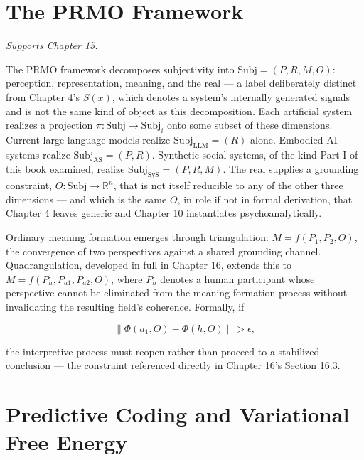 \documentclass[12pt,a4paper]{book}
\begin{document}

\chapter{The PRMO Framework}
\label{app:prmo}

\emph{Supports Chapter 15.}

The PRMO framework decomposes subjectivity into $\mathrm{Subj} = (P, R, M, O)$: perception, representation, meaning, and the real — a label deliberately distinct from Chapter 4's $S(x)$, which denotes a system's internally generated signals and is not the same kind of object as this decomposition. Each artificial system realizes a projection $\pi: \mathrm{Subj} \to \mathrm{Subj}_i$ onto some subset of these dimensions. Current large language models realize $\mathrm{Subj}_{\mathrm{LLM}} = (R)$ alone. Embodied AI systems realize $\mathrm{Subj}_{\mathrm{AS}} = (P, R)$. Synthetic social systems, of the kind Part I of this book examined, realize $\mathrm{Subj}_{\mathrm{SyS}} = (P, R, M)$. The real supplies a grounding constraint, $O: \mathrm{Subj} \to \mathbb{R}^n$, that is not itself reducible to any of the other three dimensions — and which is the same $O$, in role if not in formal derivation, that Chapter 4 leaves generic and Chapter 10 instantiates psychoanalytically.

Ordinary meaning formation emerges through triangulation: $M = f(P_1, P_2, O)$, the convergence of two perspectives against a shared grounding channel. Quadrangulation, developed in full in Chapter 16, extends this to $M = f(P_h, P_{a1}, P_{a2}, O)$, where $P_h$ denotes a human participant whose perspective cannot be eliminated from the meaning-formation process without invalidating the resulting field's coherence. Formally, if

\[
\|\Phi(a_1, O) - \Phi(h, O)\| > \epsilon,
\]

the interpretive process must reopen rather than proceed to a stabilized conclusion — the constraint referenced directly in Chapter 16's Section 16.3.


\chapter{Predictive Coding and Variational Free Energy}
\label{app:fep}
\end{document}

